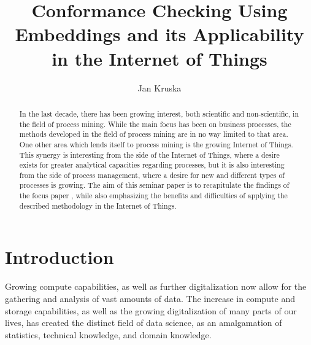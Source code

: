 \documentclass[runningheads]{template/llncs}
\begin{document}
	\title{Conformance Checking Using Embeddings and its Applicability in the Internet of Things}
	\author{Jan Kruska}
%
\maketitle              %
%
%
%
%

\begin{abstract}
	In the last decade, there has been growing interest, both scientific and non-scientific, in the field of process mining.
	While the main focus has been on business processes, the methods developed in the field of process mining are in no way limited to that area.
	One other area which lends itself to process mining is the growing Internet of Things.
	This synergy is interesting from the side of the Internet of Things, where a desire exists for greater analytical capacities regarding processes, 
	but it is also interesting from the side of process management, where a desire for new and different types of processes is growing.
	The aim of this seminar paper is to recapitulate the findings of the focus paper \cite{PBWe20}, while also emphasizing the benefits and difficulties of applying the described methodology in the Internet of Things.
\end{abstract}

\section{Introduction}

Growing compute capabilities, as well as further digitalization now allow for the gathering and analysis of vast amounts of data.
The increase in compute and storage capabilities, as well as the growing digitalization of many parts of our lives, has created the distinct field of data science, as an amalgamation of statistics, technical knowledge, and domain knowledge.
\end{document}
